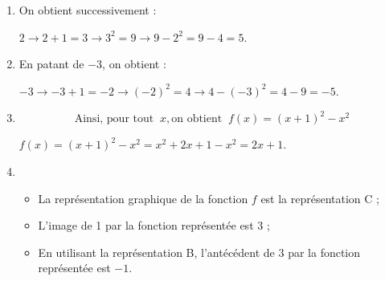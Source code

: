 \documentclass[10pt]{article}
\begin{document}
\begin{enumerate}
\item %
On obtient successivement :

$2 \to 2 + 1 = 3 \to 3^2 = 9 \to 9 - 2^2 = 9 - 4 = 5$.
\item %
En patant de $- 3$, on obtient :

$- 3 \to - 3 + 1 = - 2 \to (- 2)^2 = 4 \to 4 - (- 3)^2 = 4 - 9 = - 5$.
\item %

\[\text{Ainsi, pour tout }\:x, \text{on obtient } \:f(x) = (x + 1)^2 - x^2\]

$f(x) = (x + 1)^2 - x^2 = x^2 + 2x + 1 - x^2 = 2x + 1$.
 \item %



\begin{itemize}
\item La représentation graphique de la fonction $f$ est la représentation C ;
\item L'image de 1 par la fonction  représentée est $3$ ;
\item En utilisant la représentation B, l'antécédent de 3 par la fonction représentée est $- 1$.
\end{itemize}


\end{enumerate}
\end{document}
